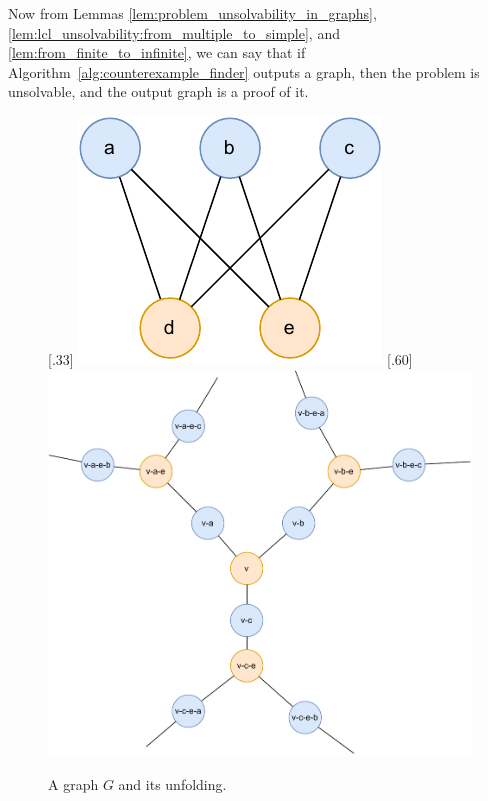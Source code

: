 Now from Lemmas \ref{lem:problem_unsolvability_in_graphs}, \ref{lem:lcl_unsolvability:from_multiple_to_simple}, and \ref{lem:from_finite_to_infinite}, we can say that if Algorithm~\ref{alg:counterexample_finder} outputs a graph, then the problem is unsolvable, and the output graph is a proof of it.

\begin{figure}[H]
      [.33\linewidth] {
      \centering
      \includegraphics[scale=0.55]{diagrams/universal_cover_1.pdf}
    }%
    \hfill
      [.60\linewidth] {
      \centering
      \includegraphics[scale=0.50]{diagrams/universal_cover_2.pdf}
    }
    \caption{A graph $G$ and its unfolding.
    }
    \label{fig:algorithm:universal_cover}
\end{figure}


